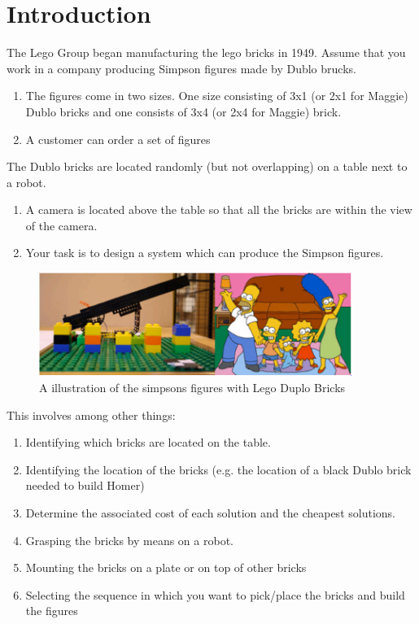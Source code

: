 \chapter{Introduction}\label{ch:introduction}
The Lego Group began manufacturing the lego bricks in 1949. 
Assume that you work in a company producing Simpson figures made by Dublo brucks.

\begin{enumerate}
	\item The figures come in two sizes. One size consisting of 3x1 (or 2x1 for Maggie) Dublo bricks and one consists of 3x4 (or 2x4 for Maggie) brick.
	\item A customer can order a set of figures
\end{enumerate}

The Dublo bricks are located randomly (but not
overlapping) on a table next to a robot.

\begin{enumerate}
	\item A camera is located above the table so that all the
	bricks are within the view of the camera.
	\item Your task is to design a system which can produce
	the Simpson figures. 
\end{enumerate}

\begin{figure}[hb]
  \centering
  \includegraphics[width=4in]{figures/simpsonLegoBricks.png}
  \caption[Simpsons figures Lego Bricks] {A illustration of the simpsons figures with Lego Duplo Bricks}
\end{figure}

This involves among other things:
\begin{enumerate}
	\item Identifying which bricks are located on the table.
	\item Identifying the location of the bricks (e.g. the location of a
	black Dublo brick needed to build Homer)
	\item Determine the associated cost of each solution and the
	cheapest solutions.
	\item Grasping the bricks by means on a robot.
	\item Mounting the bricks on a plate or on top of other bricks
	\item Selecting the sequence in which you want to pick/place
	the bricks and build the figures
\end{enumerate}

